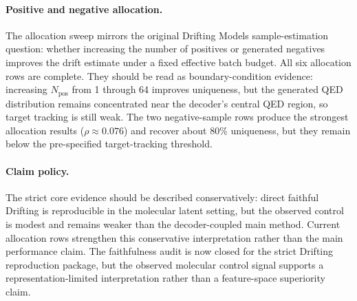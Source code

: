 \paragraph{Positive and negative allocation.}
The allocation sweep mirrors the original Drifting Models sample-estimation
question: whether increasing the number of positives or generated negatives
improves the drift estimate under a fixed effective batch budget. All six
allocation rows are complete. They should be read as boundary-condition
evidence: increasing $N_{\mathrm{pos}}$ from 1 through 64 improves uniqueness,
but the generated QED distribution remains concentrated near the decoder's
central QED region, so target tracking is still weak. The two negative-sample
rows produce the strongest allocation results ($\rho\approx0.076$) and recover
about 80\% uniqueness, but they remain below the pre-specified target-tracking
threshold.

\begin{table}[!h]
\centering
\caption{Positive/negative allocation sweep for faithful Drifting. Allocation
improves diversity more reliably than QED target tracking.}
\label{tab:supp-faithful-allocation}
\resizebox{\columnwidth}{!}{%

}
\end{table}

\paragraph{Claim policy.}
The strict core evidence should be described conservatively: direct faithful
Drifting is reproducible in the molecular latent setting, but the observed
control is modest and remains weaker than the decoder-coupled main method.
Current allocation rows strengthen this conservative interpretation rather
than the main performance claim. The faithfulness audit is now closed for the
strict Drifting reproduction package, but the observed molecular control signal
supports a representation-limited interpretation rather than a feature-space
superiority claim.
